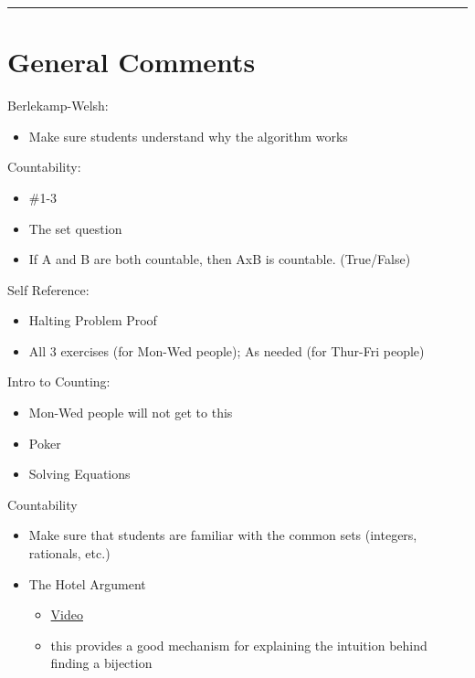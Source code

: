 \documentclass{exam}
\title{}
\date{Berlekamp-Welsh, Countability, Self Reference, Counting}
\begin{document}
\maketitle
\rule{\textwidth}{0.15em}
\fontsize{12}{15}\selectfont
\thispagestyle{empty}


\section{General Comments}
\begin{questions}
\item Berlekamp-Welsh: 
\begin{itemize}
\item Make sure students understand why the algorithm works
\end{itemize}
\item Countability: 
\begin{itemize}
\item \#1-3 
\item The set question
\item If A and B are both countable, then AxB is countable. (True/False)
\end{itemize}
\item Self Reference: 
\begin{itemize}
\item Halting Problem Proof
\item All 3 exercises (for Mon-Wed people); As needed (for Thur-Fri people)
\end{itemize}
\item Intro to Counting: 
\begin{itemize}
\item Mon-Wed people will not get to this
\item Poker
\item Solving Equations
\end{itemize}
\item Countability
\begin{itemize}
\item Make sure that students are familiar with the common sets (integers, rationals, etc.)
\item The Hotel Argument 
\begin{itemize}
\item \href{https://www.youtube.com/watch?v=6NlwpEArfwk&list=PL-XXv-cvA_iD8wQm8U0gG_Z1uHjImKXFy&index=13}{Video}
\item this provides a good mechanism for explaining the intuition behind finding a bijection

\end{itemize}
\end{itemize}
\end{questions}
\end{document}

